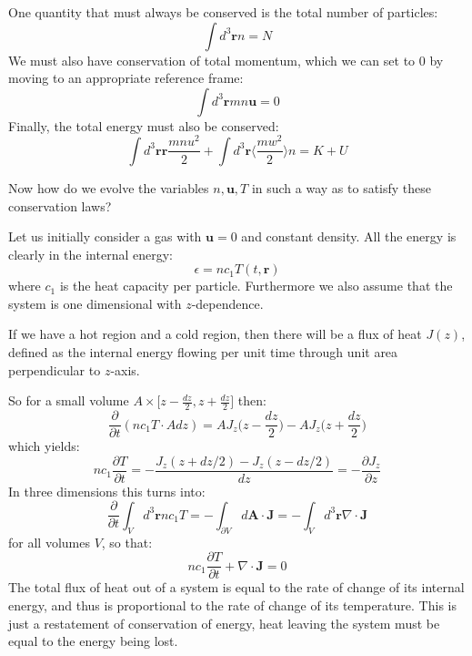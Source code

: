 \documentclass[a4paper,11pt,oneside]{book}
\newcommand{\BF}[1]{\boldsymbol{#1}}
\begin{document}
One quantity that must always be conserved is the total number of particles:
\begin{equation}
    \int d^3 \BF{r} n = N
\end{equation}
We must also have conservation of total momentum, which we can set to $0$ by moving to an appropriate reference frame:
\begin{equation}
    \int d^3\BF{r} mn \BF{u} = 0
\end{equation}
Finally, the total energy must also be conserved:
\begin{equation}
    \int d^3 \BF{r} \BF{r} \frac{mnu^2}{2} + \int d^3 \BF{r} \bigg \langle{\frac{mw^2}{2}\bigg \rangle}n = K+U
\end{equation}

Now how do we evolve the variables $n, \BF{u}, T$ in such a way as to satisfy these conservation laws? 


Let us initially consider a gas with $\BF{u} = 0$ and constant density. All the energy is clearly in the internal energy:
\begin{equation}
    \epsilon = nc_1 T(t,\BF{r})
\end{equation}
where $c_1$ is the heat capacity per particle. Furthermore we also assume that the system is one dimensional with $z$-dependence. 


If we have a hot region and a cold region, then there will be a flux of heat $J(z)$, defined as the internal energy flowing per unit time through unit area perpendicular to $z$-axis. 


So for a small volume $A \times \bigg[z-\frac{dz}{2}, z+\frac{dz}{2}\bigg]$ then:
\begin{equation}
    \frac{\partial}{\partial t}(nc_1T \cdot Adz) = AJ_z\bigg(z-\frac{dz}{2}\bigg) - AJ_z\bigg(z+\frac{dz}{2}\bigg)
\end{equation}
which yields:
\begin{equation}
    nc_1 \frac{\partial T}{\partial t} = -\frac{J_z(z+dz/2)-J_z(z-dz/2)}{dz} = -\frac{\partial J_z}{\partial z}
\end{equation}
In three dimensions this turns into:
\begin{equation}
    \frac{\partial}{\partial t} \int_V d^3\BF{r} nc_1T = - \int_{\partial V} d\BF{A} \cdot \BF{J} = - \int_V d^3 \BF{r} \nabla \cdot \BF{J}
\end{equation}
for all volumes $V$, so that:
\begin{equation}
    \boxed{nc_1\frac{\partial T}{\partial t}+\nabla \cdot \BF{J} = 0}
\end{equation}
The total flux of heat out of a system is equal to the rate of change of its internal energy, and thus is proportional to the rate of change of its temperature. This is just a restatement of conservation of energy, heat leaving the system must be equal to the energy being lost.
\end{document}
